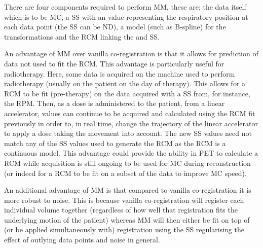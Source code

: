             There are four components required to perform \gls{MM}, these are; the data itself which is to be \gls{MC}, a \gls{SS} with an value representing the respiratory position at each data point (the \gls{SS} can be \gls{ND}), a model (such as B-spline) for the transformations and the \gls{RCM} linking the  and \gls{SS}.
            
            An advantage of \gls{MM} over vanilla co-registration is that it allows for prediction of data not used to fit the \gls{RCM}. This advantage is particularly useful for radiotherapy. Here, some data is acquired on the machine used to perform radiotherapy (usually on the patient on the day of therapy). This allows for a \gls{RCM} to be fit (pre-therapy) on the data acquired with a \gls{SS} from, for instance, the \gls{RPM}. Then, as a dose is administered to the patient, from a linear accelerator,  values can continue to be acquired and  calculated using the \gls{RCM} fit previously in order to, in real time, change the trajectory of the linear accelerator to apply a dose taking the movement into account. The new \gls{SS} values need not match any of the \gls{SS} values used to generate the \gls{RCM} as the \gls{RCM} is a continuous model. This advantage could provide the ability in \gls{PET} to calculate a \gls{RCM} while acquisition is still ongoing to be used for \gls{MC} during reconstruction (or indeed for a \gls{RCM} to be fit on a subset of the data to improve \gls{MC} speed).
            
            An additional advantage of \gls{MM} is that compared to vanilla co-registration it is more robust to noise. This is because vanilla co-registration will register each individual volume together (regardless of how well that registration fits the underlying motion of the patient) whereas \gls{MM} will then either be fit on top of (or be applied simultaneously with) registration using the \gls{SS} regularising the effect of outlying data points and noise in general.
            

